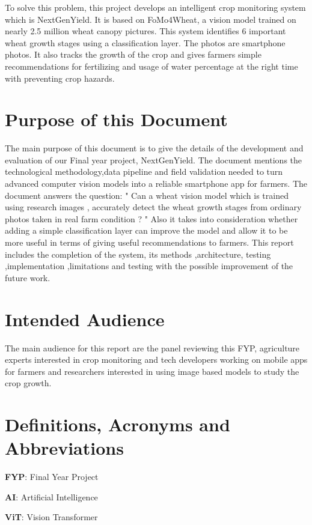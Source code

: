 \documentclass{FastFyp}
\begin{document}
To solve this problem, this project develops an intelligent crop monitoring system which is NextGenYield. It is based on FoMo4Wheat, a vision model trained on nearly 2.5 million wheat canopy pictures. This system identifies 6 important wheat growth stages using a classification layer. The photos are smartphone photos. It also tracks the growth of the crop and gives farmers simple recommendations for fertilizing and usage of water percentage at the right time with preventing crop hazards.

 
\section{Purpose of this Document}

The main purpose of this document is to give the details of the development and evaluation of our Final year project, NextGenYield. The document mentions the technological methodology,data pipeline and field validation needed to turn advanced computer vision models into a reliable smartphone app for farmers. The document answers the question: " Can a wheat vision model which is trained using research images , accurately detect the wheat growth stages from ordinary photos taken in real farm condition ? "
Also it takes into consideration whether adding a simple classification layer can improve the model and allow it to be more useful in terms of giving useful recommendations to farmers. This report includes the completion of the system, its methods ,architecture, testing ,implementation ,limitations and testing with the possible improvement of the future work.

 
\section{Intended Audience}
The main audience for this report are the panel reviewing this FYP, agriculture experts interested in crop monitoring and tech developers working on mobile apps for farmers and researchers interested in using image based models to study the crop growth. 

\section{Definitions, Acronyms and Abbreviations}

\textbf{FYP}: Final Year Project  

\textbf{AI}: Artificial Intelligence   

\textbf{ViT}: Vision Transformer  
\end{document}
